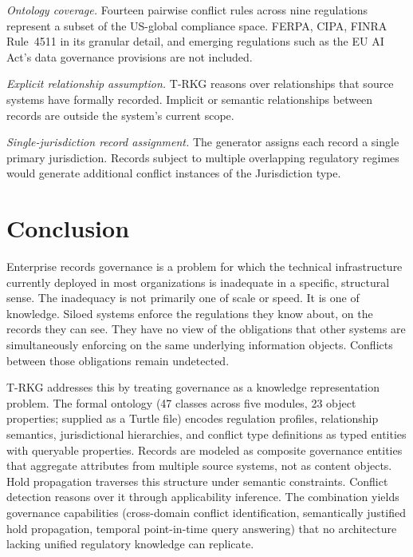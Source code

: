 \documentclass{ieeeaccess}
\begin{document}
\textit{Ontology coverage.} Fourteen pairwise conflict rules across nine regulations represent a subset of the US-global compliance space. FERPA, CIPA, FINRA Rule~4511 in its granular detail, and emerging regulations such as the EU AI Act's data governance provisions are not included.

\textit{Explicit relationship assumption.} T-RKG reasons over relationships that source systems have formally recorded. Implicit or semantic relationships between records are outside the system's current scope.

\textit{Single-jurisdiction record assignment.} The generator assigns each record a single primary jurisdiction. Records subject to multiple overlapping regulatory regimes would generate additional conflict instances of the Jurisdiction type.

\section{Conclusion}

Enterprise records governance is a problem for which the technical infrastructure currently deployed in most organizations is inadequate in a specific, structural sense. The inadequacy is not primarily one of scale or speed. It is one of knowledge. Siloed systems enforce the regulations they know about, on the records they can see. They have no view of the obligations that other systems are simultaneously enforcing on the same underlying information objects. Conflicts between those obligations remain undetected.

T-RKG addresses this by treating governance as a knowledge representation problem. The formal ontology (47 classes across five modules, 23 object properties; supplied as a Turtle file) encodes regulation profiles, relationship semantics, jurisdictional hierarchies, and conflict type definitions as typed entities with queryable properties. Records are modeled as composite governance entities that aggregate attributes from multiple source systems, not as content objects. Hold propagation traverses this structure under semantic constraints. Conflict detection reasons over it through applicability inference. The combination yields governance capabilities (cross-domain conflict identification, semantically justified hold propagation, temporal point-in-time query answering) that no architecture lacking unified regulatory knowledge can replicate.
\end{document}
